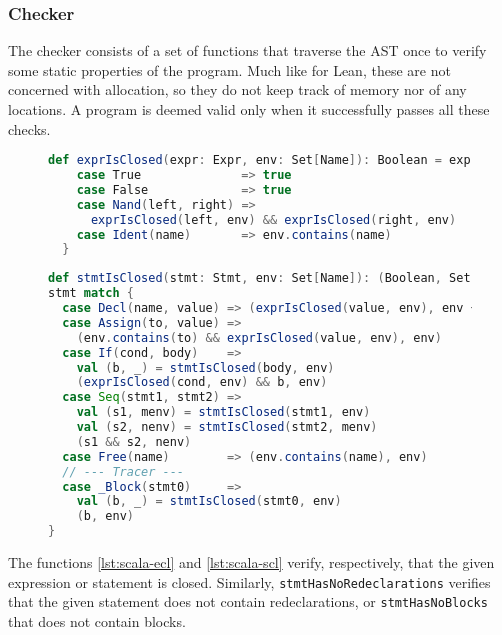 \subsubsection{Checker}

The checker consists of a set of functions that traverse the AST once to verify some static properties of the program. Much like for Lean, these are not concerned with allocation, so they do not keep track of memory nor of any locations. A program is deemed valid only when it successfully passes all these checks.

\begin{figure}[H]
  \begin{minipage}{0.45\textwidth}
    \centering
    \begin{lstlisting}[language=Scala, caption={Expression closedness check},label={lst:scala-ecl},frame=none,escapechar=*,basicstyle=\tt\scriptsize]
  def exprIsClosed(expr: Expr, env: Set[Name]): Boolean = expr match {
    case True              => true
    case False             => true
    case Nand(left, right) =>
      exprIsClosed(left, env) && exprIsClosed(right, env)
    case Ident(name)       => env.contains(name)
  }
\end{lstlisting}
  \end{minipage}%
  \centering
  \begin{minipage}{0.55\textwidth}
    \centering
    \begin{lstlisting}[language=Scala, caption={Statement closedness check},label={lst:scala-scl},frame=none,escapechar=*,basicstyle=\tt\scriptsize]
def stmtIsClosed(stmt: Stmt, env: Set[Name]): (Boolean, Set[Name]) =
stmt match {
  case Decl(name, value) => (exprIsClosed(value, env), env + name)
  case Assign(to, value) =>
    (env.contains(to) && exprIsClosed(value, env), env)
  case If(cond, body)    =>
    val (b, _) = stmtIsClosed(body, env)
    (exprIsClosed(cond, env) && b, env)
  case Seq(stmt1, stmt2) =>
    val (s1, menv) = stmtIsClosed(stmt1, env)
    val (s2, nenv) = stmtIsClosed(stmt2, menv)
    (s1 && s2, nenv)
  case Free(name)        => (env.contains(name), env)
  // --- Tracer ---
  case _Block(stmt0)     =>
    val (b, _) = stmtIsClosed(stmt0, env)
    (b, env)
}
\end{lstlisting}
  \end{minipage}
\end{figure}

The functions \ref{lst:scala-ecl} and \ref{lst:scala-scl} verify, respectively, that the given expression or statement is closed. Similarly, \texttt{stmtHasNoRedeclarations} verifies that the given statement does not contain redeclarations, or \texttt{stmtHasNoBlocks} that does not contain blocks.

